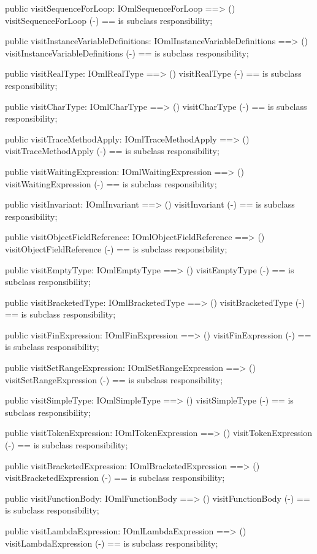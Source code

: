 \begin{vdm_al}
  public visitSequenceForLoop: IOmlSequenceForLoop ==> ()
  visitSequenceForLoop (-) == is subclass responsibility;

  public visitInstanceVariableDefinitions: IOmlInstanceVariableDefinitions ==> ()
  visitInstanceVariableDefinitions (-) == is subclass responsibility;

  public visitRealType: IOmlRealType ==> ()
  visitRealType (-) == is subclass responsibility;

  public visitCharType: IOmlCharType ==> ()
  visitCharType (-) == is subclass responsibility;

  public visitTraceMethodApply: IOmlTraceMethodApply ==> ()
  visitTraceMethodApply (-) == is subclass responsibility;

  public visitWaitingExpression: IOmlWaitingExpression ==> ()
  visitWaitingExpression (-) == is subclass responsibility;

  public visitInvariant: IOmlInvariant ==> ()
  visitInvariant (-) == is subclass responsibility;

  public visitObjectFieldReference: IOmlObjectFieldReference ==> ()
  visitObjectFieldReference (-) == is subclass responsibility;

  public visitEmptyType: IOmlEmptyType ==> ()
  visitEmptyType (-) == is subclass responsibility;

  public visitBracketedType: IOmlBracketedType ==> ()
  visitBracketedType (-) == is subclass responsibility;

  public visitFinExpression: IOmlFinExpression ==> ()
  visitFinExpression (-) == is subclass responsibility;

  public visitSetRangeExpression: IOmlSetRangeExpression ==> ()
  visitSetRangeExpression (-) == is subclass responsibility;

  public visitSimpleType: IOmlSimpleType ==> ()
  visitSimpleType (-) == is subclass responsibility;

  public visitTokenExpression: IOmlTokenExpression ==> ()
  visitTokenExpression (-) == is subclass responsibility;

  public visitBracketedExpression: IOmlBracketedExpression ==> ()
  visitBracketedExpression (-) == is subclass responsibility;

  public visitFunctionBody: IOmlFunctionBody ==> ()
  visitFunctionBody (-) == is subclass responsibility;

  public visitLambdaExpression: IOmlLambdaExpression ==> ()
  visitLambdaExpression (-) == is subclass responsibility;


\end{vdm_al}
